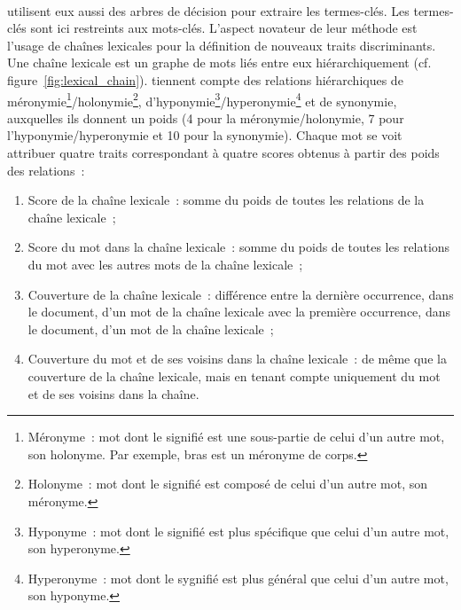         ~\\ utilisent eux aussi des arbres de
        décision pour extraire les termes-clés. Les termes-clés sont ici
        restreints aux mots-clés. L'aspect novateur de leur méthode est l'usage
        de chaînes lexicales pour la définition de nouveaux traits
        discriminants. Une chaîne lexicale est un graphe de mots liés entre eux
        hiérarchiquement (cf. figure~\ref{fig:lexical_chain}).
         tiennent compte des relations
        hiérarchiques de méronymie\footnote{Méronyme~: mot dont le signifié est
        une sous-partie de celui d'un autre mot, son holonyme. Par exemple,
        \og{}bras\fg{} est un méronyme de
        \og{}corps\fg{}.}/holonymie\footnote{Holonyme~: mot dont le signifié est
        composé de celui d'un autre mot, son méronyme.},
        d'hyponymie\footnote{Hyponyme~: mot dont le signifié est
        plus spécifique que celui d'un autre mot, son
        hyperonyme.}/hyperonymie\footnote{Hyperonyme~: mot dont le sygnifié est
        plus général que celui d'un autre mot, son hyponyme.} et de synonymie,
        auxquelles ils donnent un poids (4 pour la méronymie/holonymie, 7 pour
        l'hyponymie/hyperonymie et 10 pour la synonymie). Chaque mot se voit
        attribuer quatre traits correspondant à quatre scores obtenus à partir
        des poids des relations~:
        \begin{enumerate}
          \item{Score de la chaîne lexicale~: somme du poids de toutes les
                relations de la chaîne lexicale~;}
          \item{Score du mot dans la chaîne lexicale~: somme du poids de toutes
                les relations du mot avec les autres mots de la chaîne
                lexicale~;}
          \item{Couverture de la chaîne lexicale~: différence entre la dernière
                occurrence, dans le document, d'un mot de la chaîne lexicale
                avec la première occurrence, dans le document, d'un mot de la
                chaîne lexicale~;}
          \item{Couverture du mot et de ses voisins dans la chaîne lexicale~:
                de même que la couverture de la chaîne lexicale, mais en tenant
                compte uniquement du mot et de ses voisins dans la chaîne.}
        \end{enumerate}
